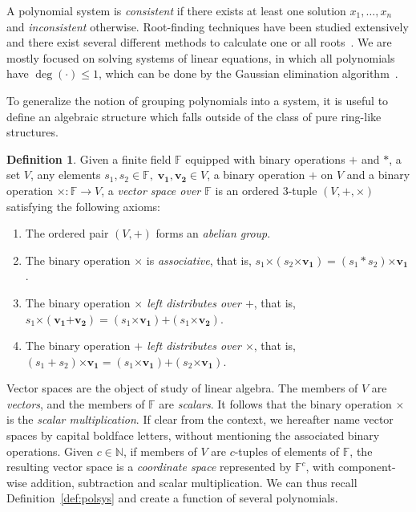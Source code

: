 \documentclass[12pt, a4paper, oneside]{memoir}
\theoremstyle{definition}
\newtheorem{definition}[theorem]{Definition}
\begin{document}
A polynomial system is \emph{consistent} if there exists at least one solution $x_{1}, \dots, x_{n}$ and \emph{inconsistent} otherwise. Root-finding techniques have been studied extensively and there exist several different methods to calculate one or all roots~\cite[Chapter 9]{Press:2007}. We are mostly focused on solving systems of linear equations, in which all polynomials have $\deg(\cdot) \leq 1$, which can be done by the Gaussian elimination algorithm~\cite[Section 2.2]{Press:2007}.

To generalize the notion of grouping polynomials into a system, it is useful to define an algebraic structure which falls outside of the class of pure ring-like structures.

\begin{definition}
  Given a finite field $\mathbb{F}$ equipped with binary operations $+$ and $\ast$, a set $V$, any elements $s_{1}, s_{2} \in \mathbb{F},\; \mathbf{v_{1}}, \mathbf{v_{2}} \in V$, a binary operation $\bm{+}$ on $V$ and a binary operation $\bm{\times} : \mathbb{F} \to V$, a \emph{vector space over $\mathbb{F}$} is an ordered $3$-tuple $(V, \bm{+}, \bm{\times})$ satisfying the following axioms:
  
  \begin{enumerate}
    \item The ordered pair $(V, \bm{+})$ forms an \emph{abelian group}.
    \item The binary operation $\bm{\times}$ is \emph{associative}, that is, $s_{1} \bm{\times} (s_{2} \bm{\times} \mathbf{v_{1}}) = (s_{1} \ast s_{2}) \bm{\times} \mathbf{v_{1}}$.
    \item The binary operation \emph{$\bm{\times}$ left distributes over $\bm{+}$}, that is, $s_{1} \bm{\times} (\mathbf{v_{1}} \bm{+} \mathbf{v_{2}}) = (s_{1} \bm{\times} \mathbf{v_{1}}) \bm{+} (s_{1} \bm{\times} \mathbf{v_{2}})$.
    \item The binary operation \emph{$\bm{+}$ left distributes over $\bm{\times}$}, that is, $(s_{1} + s_{2}) \bm{\times} \mathbf{v_{1}} = (s_{1} \bm{\times} \mathbf{v_{1}}) \bm{+} (s_{2} \bm{\times} \mathbf{v_{1}})$.
  \end{enumerate}
\end{definition}

Vector spaces are the object of study of linear algebra. The members of $V$ are \emph{vectors}, and the members of $\mathbb{F}$ are \emph{scalars}. It follows that the binary operation $\bm{\times}$ is the \emph{scalar multiplication}. If clear from the context, we hereafter name vector spaces by capital boldface letters, without mentioning the associated binary operations. Given $c \in \mathbb{N}$, if members of $V$ are $c$-tuples of elements of $\mathbb{F}$, the resulting vector space is a \emph{coordinate space} represented by $\mathbb{F}^{c}$, with component-wise addition, subtraction and scalar multiplication. We can thus recall Definition~\ref{def:polsys} and create a function of several polynomials.
\end{document}
